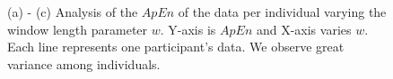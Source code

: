 \documentclass{llncs}
\begin{document}
  \begin{figure}[t]
    \centering
    \hfill
    \hfill

    \caption{(a) - (c) Analysis of the $ApEn$ of the data per individual varying the window length parameter $w$. Y-axis is $ApEn$ and X-axis varies $w$. Each line represents one participant's data. We observe great variance among individuals.}
    \label{fig:individual_entropy}

  \end{figure}
\end{document}
